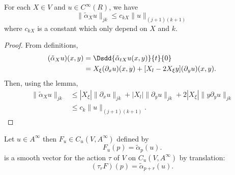 \begin{proposition}
	For each $X\in V$ and $u\in C^{\infty}(R)$, we have
	\begin{equation}
		\| \tilde\alpha_Xu \|_{jk}\leq c_{kX}\| u \|_{(j+1)(k+1)}
	\end{equation}
	where $c_{kX}$ is a constant which only depend on $X$ and $k$.
\end{proposition}

\begin{proof}
	From definitions,
	\begin{equation}
		\begin{split}
			(\tilde\alpha_Xu)(x,y)&=\Dsdd{ \tilde\alpha_{tX}u(x,y) }{t}{0}\\
			&=X_{\xi}(\partial_xu)(x,y)+[X_l-2X_{\xi}y](\partial_yu)(x,y).
		\end{split}
	\end{equation}
	Then, using the lemma,
	\begin{equation}
		\begin{split}
			\| \tilde\alpha_Xu \|_{jk}&\leq | X_{\xi} |\| \partial_xu \|_{jk}+| X_l |\| \partial_yu \|_{jk}+2| X_{\xi} |\| y\partial_yu \|_{jk}\\
			&\leq c_k\| u \|_{(j+1)(k+1)}.
		\end{split}
	\end{equation}

\end{proof}


\begin{proposition}
	Let $u\in A^{\infty}$ then $F_u\in C_u(V,A^{\infty})$ defined by
	\[
		F_u(p)=\tilde\alpha_p(u).
	\]
	is a smooth vector for the action $\tau$ of $V$ on $C_u(V,A^{\infty})$ by translation:
	\[
		(\tau_rF)(p)=\tilde\alpha_{p+r}(u).
	\]

\end{proposition}

